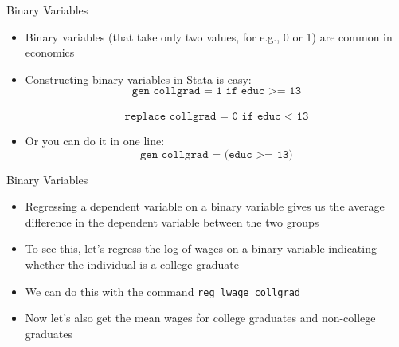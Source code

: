 \documentclass[11pt,notes=hide,aspectratio=169,mathserif]{beamer}
\begin{document}
\begin{frame}{Binary Variables}
    \begin{itemize}
        \item Binary variables (that take only two values, for e.g., 0 or 1) are common in economics
        \item Constructing binary variables in Stata is easy:
        $$\texttt{gen collgrad = 1 if educ >= 13}$$ \\
        $$\texttt{replace collgrad = 0 if educ < 13}$$ 
        \item Or you can do it in one line:
        $$\texttt{gen collgrad = (educ >= 13)}$$
    \end{itemize}
\end{frame}

\begin{frame}{Binary Variables}
    \begin{itemize}
        \item Regressing a dependent variable on a binary variable gives us the average difference in the dependent variable between the two groups
        \item To see this, let's regress the log of wages on a binary variable indicating whether the individual is a college graduate
        \item We can do this with the command \texttt{reg lwage collgrad}
        \item Now let's also get the mean wages for college graduates and non-college graduates
    \end{itemize}
\end{frame}
\end{document}

